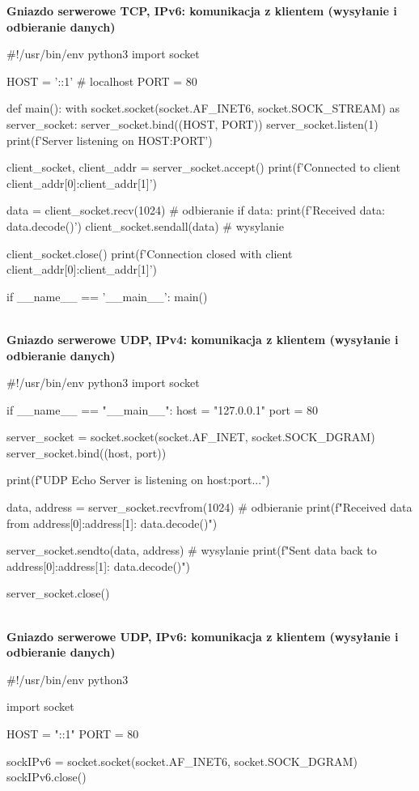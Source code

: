 \noindent \textbf{Gniazdo serwerowe TCP, IPv6: komunikacja z klientem (wysyłanie i odbieranie danych)}

\begin{code}
#!/usr/bin/env python3
import socket

HOST = '::1'  # localhost
PORT = 80

def main():
    with socket.socket(socket.AF_INET6, socket.SOCK_STREAM) as server_socket:
        server_socket.bind((HOST, PORT))
        server_socket.listen(1)
        print(f'Server listening on {HOST}:{PORT}')

        client_socket, client_addr = server_socket.accept()
        print(f'Connected to client {client_addr[0]}:{client_addr[1]}')

        data = client_socket.recv(1024)					# odbieranie
        if data:
            print(f'Received data: {data.decode()}')
            client_socket.sendall(data)					# wysylanie

        client_socket.close()
        print(f'Connection closed with client {client_addr[0]}:{client_addr[1]}')

if __name__ == '__main__':
    main()
\end{code}\mbox{}\\

\newpage
\noindent \textbf{Gniazdo serwerowe UDP, IPv4: komunikacja z klientem (wysyłanie i odbieranie danych)}

\begin{code}
#!/usr/bin/env python3
import socket

if __name__ == "__main__":
    host = "127.0.0.1"   
    port = 80   
    
    server_socket = socket.socket(socket.AF_INET, socket.SOCK_DGRAM)
    server_socket.bind((host, port))

    print(f"UDP Echo Server is listening on {host}:{port}...")

    data, address = server_socket.recvfrom(1024)					# odbieranie
    print(f"Received data from {address[0]}:{address[1]}: {data.decode()}")

    server_socket.sendto(data, address)														# wysylanie
    print(f"Sent data back to {address[0]}:{address[1]}: {data.decode()}")

    server_socket.close()
\end{code}\mbox{}\\

\noindent \textbf{Gniazdo serwerowe UDP, IPv6: komunikacja z klientem (wysyłanie i odbieranie danych)}

\begin{code}
#!/usr/bin/env python3

import socket

HOST = "::1"
PORT = 80

sockIPv6 = socket.socket(socket.AF_INET6, socket.SOCK_DGRAM)
sockIPv6.close()
\end{code}

